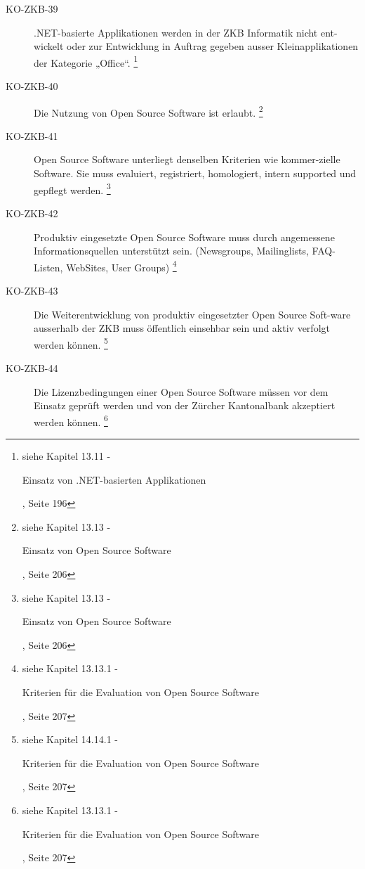 \documentclass[abstracton, listof=totocnumbered,
bibliography=totocnumbered]{scrreprt}
\begin{document}
\begin{description}
    \item[KO-ZKB-39] .NET-basierte Applikationen werden in der ZKB Informatik
    nicht ent-wickelt oder zur Entwicklung in Auftrag gegeben ausser
    Kleinapplikationen der Kategorie „Office“.
    \footnote{siehe Kapitel 13.11 -
    \begin{itshape}Einsatz von .NET-basierten Applikationen\end{itshape}, Seite
    196}
    
    \item[KO-ZKB-40] Die Nutzung von Open Source Software ist erlaubt.
    \footnote{siehe Kapitel 13.13 -
    \begin{itshape}Einsatz von Open Source Software\end{itshape}, Seite 206}
    
    \item[KO-ZKB-41] Open Source Software unterliegt denselben Kriterien wie
    kommer-zielle Software. Sie muss evaluiert, registriert, homologiert, intern
    supported und gepflegt werden.
    \footnote{siehe Kapitel 13.13 -
    \begin{itshape}Einsatz von Open Source Software\end{itshape}, Seite 206}
    
    \item[KO-ZKB-42] Produktiv eingesetzte Open Source Software muss durch
    angemessene Informationsquellen unterstützt sein. (Newsgroups,
    Mailinglists, FAQ-Listen, WebSites, User Groups)
    \footnote{siehe Kapitel 13.13.1 -
    \begin{itshape}Kriterien für die Evaluation von Open Source
    Software\end{itshape}, Seite 207}
    
    \item[KO-ZKB-43] Die Weiterentwicklung von produktiv eingesetzter Open
    Source Soft-ware ausserhalb der ZKB muss öffentlich einsehbar sein und aktiv verfolgt werden können.
    \footnote{siehe Kapitel 14.14.1 -
    \begin{itshape}Kriterien für die Evaluation von Open Source
    Software\end{itshape}, Seite 207}
    
    \item[KO-ZKB-44] Die Lizenzbedingungen einer Open Source Software müssen vor
    dem Einsatz geprüft werden und von der Zürcher Kantonalbank akzeptiert werden
    können.
    \footnote{siehe Kapitel 13.13.1 -
    \begin{itshape}Kriterien für die Evaluation von Open Source
    Software\end{itshape}, Seite 207}
  \end{description}
  
\end{document}
